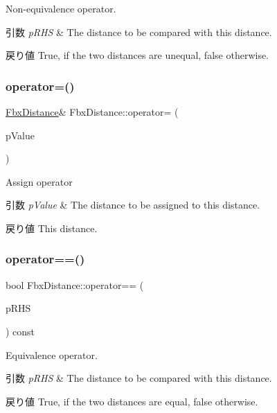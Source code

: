 Non-\/equivalence operator. 
\begin{DoxyParams}{引数}
{\em p\+R\+HS} & The distance to be compared with this distance. \\
\hline
\end{DoxyParams}
\begin{DoxyReturn}{戻り値}
{\ttfamily True}, if the two distances are unequal, {\ttfamily false} otherwise. 
\end{DoxyReturn}
\mbox{\label{class_fbx_distance_a86e23a798f2893137460c5f5bb9c6b9b}} 
\subsubsection{\texorpdfstring{operator=()}{operator=()}}
{\footnotesize\ttfamily \hyperlink{class_fbx_distance}{Fbx\+Distance}\& Fbx\+Distance\+::operator= (\begin{DoxyParamCaption}\item[{const \hyperlink{class_fbx_distance}{Fbx\+Distance} \&}]{p\+Value }\end{DoxyParamCaption})}

Assign operator 
\begin{DoxyParams}{引数}
{\em p\+Value} & The distance to be assigned to this distance. \\
\hline
\end{DoxyParams}
\begin{DoxyReturn}{戻り値}
This distance. 
\end{DoxyReturn}
\mbox{\label{class_fbx_distance_aaa4847c97c6545a8f439c234960e302a}} 
\subsubsection{\texorpdfstring{operator==()}{operator==()}}
{\footnotesize\ttfamily bool Fbx\+Distance\+::operator== (\begin{DoxyParamCaption}\item[{const \hyperlink{class_fbx_distance}{Fbx\+Distance} \&}]{p\+R\+HS }\end{DoxyParamCaption}) const}

Equivalence operator. 
\begin{DoxyParams}{引数}
{\em p\+R\+HS} & The distance to be compared with this distance. \\
\hline
\end{DoxyParams}
\begin{DoxyReturn}{戻り値}
{\ttfamily True}, if the two distances are equal, {\ttfamily false} otherwise. 
\end{DoxyReturn}
\mbox{\label{class_fbx_distance_a205e0b8479de5b96079473facb81926c}} 
